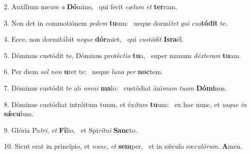 2. Auxílium me\textit{um} \textit{a} \textbf{Dó}mino, \ast\  qui fecit \textit{cæ}\textit{lum} \textit{et} \textbf{ter}ram.\

3. Non det in commotiónem \textit{pe}\textit{dem} \textbf{tu}um: \ast\  neque dormí\textit{tet} \textit{qui} \textit{cus}\textbf{tó}\textbf{dit} te.\

4. Ecce, non dormitábit \textit{ne}\textit{que} \textbf{dór}miet, \ast\  qui \textit{cus}\textit{tó}\textit{dit} \textbf{Is}\textbf{ra}ël.\

5. Dóminus custódit te, Dóminus protéc\textit{ti}\textit{o} \textbf{tu}a, \ast\  super manum \textit{déx}\textit{te}\textit{ram} \textbf{tu}am.\

6. Per diem \textit{sol} \textit{non} \textbf{u}ret te: \ast\  neque \textit{lu}\textit{na} \textit{per} \textbf{noc}tem.\

7. Dóminus custódit te ab \textit{om}\textit{ni} \textbf{ma}lo: \ast\  custódiat áni\textit{mam} \textit{tu}\textit{am} \textbf{Dó}\textbf{mi}nus.\

8. Dóminus custódiat intróitum tuum, et éx\textit{i}\textit{tum} \textbf{tu}um: \ast\  ex hoc nunc, et \textit{us}\textit{que} \textit{in} \textbf{sǽ}\textbf{cu}lum.\

9. Glória Pa\textit{tri}, \textit{et} \textbf{Fí}lio, \ast\  et Spi\textit{rí}\textit{tu}\textit{i} \textbf{Sanc}to.\

10. Sicut erat in princípio, et \textit{nunc}, \textit{et} \textbf{sem}per, \ast\  et in sǽcula sæ\textit{cu}\textit{ló}\textit{rum}. \textbf{A}men.\

